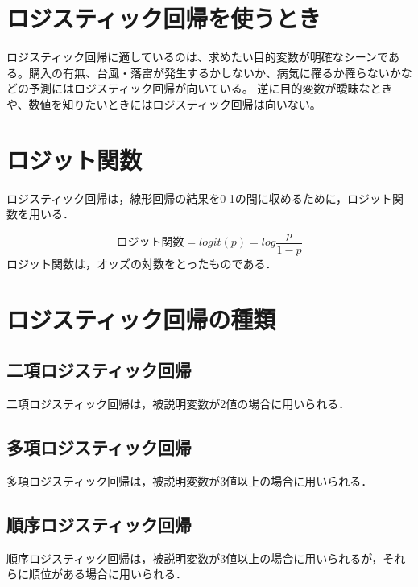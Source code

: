 \documentclass[a4paper,upLaTeX,luatex,12pt]{ltjsarticle}
\begin{document}
\section{ロジスティック回帰を使うとき}
ロジスティック回帰に適しているのは、求めたい目的変数が明確なシーンである。購入の有無、台風・落雷が発生するかしないか、病気に罹るか罹らないかなどの予測にはロジスティック回帰が向いている。
逆に目的変数が曖昧なときや、数値を知りたいときにはロジスティック回帰は向いない。
\section{ロジット関数}
ロジスティック回帰は，線形回帰の結果を0-1の間に収めるために，ロジット関数を用いる．\par
\begin{equation}
  ロジット関数=logit(p)=log\frac{p}{1-p}
\end{equation}
ロジット関数は，オッズの対数をとったものである．\par
\section{ロジスティック回帰の種類}
\subsection{二項ロジスティック回帰}
二項ロジスティック回帰は，被説明変数が2値の場合に用いられる．\par
\subsection{多項ロジスティック回帰}
多項ロジスティック回帰は，被説明変数が3値以上の場合に用いられる．\par
\subsection{順序ロジスティック回帰}
順序ロジスティック回帰は，被説明変数が3値以上の場合に用いられるが，それらに順位がある場合に用いられる．\par
\end{document}
